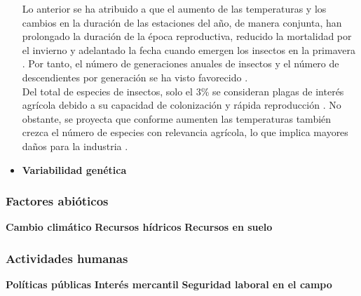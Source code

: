 \begin{itemize}[leftmargin=0cm, itemsep=0.5 cm]
{	
	Lo anterior se ha atribuido a que el aumento de las temperaturas y los cambios en la duración de las estaciones del año, de manera conjunta, han prolongado la duración de la época reproductiva, reducido la mortalidad por el invierno y adelantado la fecha cuando emergen los insectos en la primavera \cite{Kiritani_2013}. Por tanto, el número de generaciones anuales de insectos y el número de descendientes por generación se ha visto favorecido \cite{Harvey_2022}.\\
	
	Del total de especies de insectos, solo el 3\% se consideran plagas de interés agrícola debido a su capacidad de colonización y rápida reproducción \cite{Garcia-Lara_2016}. No obstante, se proyecta que conforme aumenten las temperaturas también crezca el número de especies con relevancia agrícola, lo que implica mayores daños para la industria \cite{Deutsch_2018}.
	}
	\item[]\textbf{Variabilidad genética}
\end{itemize}


\subsubsection{Factores abióticos}
\textbf{Cambio climático}
\textbf{Recursos hídricos}
\textbf{Recursos en suelo}

\subsubsection{Actividades humanas}
\textbf{Políticas públicas}
\textbf{Interés mercantil}
\textbf{Seguridad laboral en el campo}
